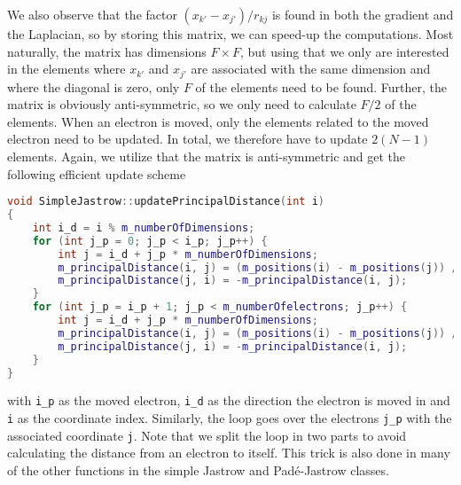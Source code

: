 We also observe that the factor $(x_{k'}-x_{j'})/r_{kj}$ is found in both the gradient and the Laplacian, so by storing this matrix, we can speed-up the computations. Most naturally, the matrix has dimensions $F\times F$, but using that we only are interested in the elements where $x_{k'}$ and $x_{j'}$ are associated with the same dimension and where the diagonal is zero, only $F$ of the elements need to be found. Further, the matrix is obviously anti-symmetric, so we only need to calculate $F/2$ of the elements. When an electron is moved, only the elements related to the moved electron need to be updated. In total, we therefore have to update $2(N-1)$ elements. Again, we utilize that the matrix is anti-symmetric and get the following efficient update scheme
\begin{lstlisting}[language={c++}]
void SimpleJastrow::updatePrincipalDistance(int i)
{
	int i_d = i % m_numberOfDimensions;
	for (int j_p = 0; j_p < i_p; j_p++) {
		int j = i_d + j_p * m_numberOfDimensions;
		m_principalDistance(i, j) = (m_positions(i) - m_positions(j)) / m_distanceMatrix(i_p, j_p);
		m_principalDistance(j, i) = -m_principalDistance(i, j);
	}
	for (int j_p = i_p + 1; j_p < m_numberOfelectrons; j_p++) {
		int j = i_d + j_p * m_numberOfDimensions;
		m_principalDistance(i, j) = (m_positions(i) - m_positions(j)) / m_distanceMatrix(i_p, j_p);
		m_principalDistance(j, i) = -m_principalDistance(i, j);
	}
}
\end{lstlisting}
with \lstinline{i_p} as the moved electron, \lstinline{i_d} as the direction the electron is moved in and \lstinline|i| as the coordinate index. Similarly, the loop goes over the electrons \lstinline{j_p} with the associated coordinate \lstinline{j}. Note that we split the loop in two parts to avoid calculating the distance from an electron to itself. This trick is also done in many of the other functions in the simple Jastrow and Padé-Jastrow classes. 

